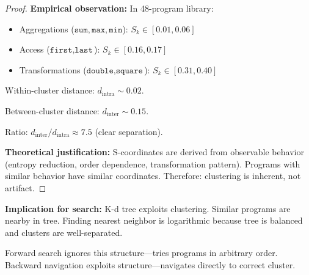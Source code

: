 \documentclass[twocolumn,10pt]{article}
\theoremstyle{definition}
\theoremstyle{remark}
\newcommand{\Sk}{S_k}
\begin{document}
\begin{proof}
\textbf{Empirical observation:} In 48-program library:

\begin{itemize}
\item Aggregations ($\texttt{sum}, \texttt{max}, \texttt{min}$): $\Sk \in [0.01, 0.06]$
\item Access ($\texttt{first}, \texttt{last}$): $\Sk \in [0.16, 0.17]$
\item Transformations ($\texttt{double}, \texttt{square}$): $\Sk \in [0.31, 0.40]$
\end{itemize}

Within-cluster distance: $d_{\text{intra}} \sim 0.02$.

Between-cluster distance: $d_{\text{inter}} \sim 0.15$.

Ratio: $d_{\text{inter}}/d_{\text{intra}} \approx 7.5$ (clear separation).

\vspace{0.2cm}
\noindent\textbf{Theoretical justification:} S-coordinates are derived from observable behavior (entropy reduction, order dependence, transformation pattern). Programs with similar behavior have similar coordinates. Therefore: clustering is inherent, not artifact.
\end{proof}

\vspace{0.2cm}
\noindent\textbf{Implication for search:} K-d tree exploits clustering. Similar programs are nearby in tree. Finding nearest neighbor is logarithmic because tree is balanced and clusters are well-separated.

\vspace{0.2cm}
\noindent Forward search ignores this structure—tries programs in arbitrary order. Backward navigation exploits structure—navigates directly to correct cluster.
\end{document}
